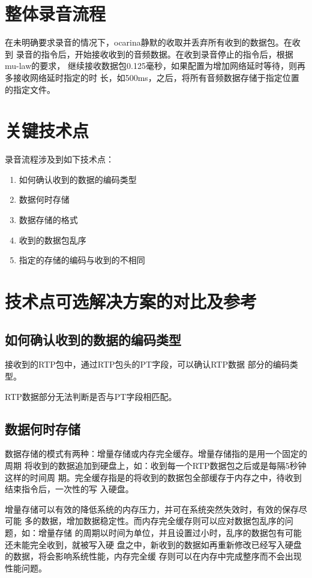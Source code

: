 \documentclass[11pt]{article}
\begin{document}
\section{整体录音流程}
    在未明确要求录音的情况下，ocarina静默的收取并丢弃所有收到的数据包。在收到
录音的指令后，开始接收收到的音频数据。在收到录音停止的指令后，根据mu-law的要求，
继续接收数据包0.125毫秒，如果配置为增加网络延时等待，则再多接收网络延时指定的时
长，如500ms，之后，将所有音频数据存储于指定位置的指定文件。
\section{关键技术点}
录音流程涉及到如下技术点：
    \begin{enumerate}
        \item 如何确认收到的数据的编码类型
        \item 数据何时存储
        \item 数据存储的格式
        \item 收到的数据包乱序
        \item 指定的存储的编码与收到的不相同
    \end{enumerate}
\section{技术点可选解决方案的对比及参考}
\subsection{如何确认收到的数据的编码类型}
    接收到的RTP包中，通过RTP包头的PT字段，可以确认RTP数据
部分的编码类型。

    RTP数据部分无法判断是否与PT字段相匹配。
\subsection{数据何时存储}
    数据存储的模式有两种：增量存储或内存完全缓存。增量存储指的是用一个固定的周期
将收到的数据追加到硬盘上，如：收到每一个RTP数据包之后或是每隔5秒钟这样的时间周
期。完全缓存指是的将收到的数据包全部缓存于内存之中，待收到结束指令后，一次性的写
入硬盘。

    增量存储可以有效的降低系统的内存压力，并可在系统突然失效时，有效的保存尽可能
多的数据，增加数据稳定性。而内存完全缓存则可以应对数据包乱序的问题，如：增量存储
的周期以时间为单位，并且设置过小时，乱序的数据包有可能还未能完全收到，就被写入硬
盘之中，新收到的数据如再重新修改已经写入硬盘的数据，将会影响系统性能，内存完全缓
存则可以在内存中完成整序而不会出现性能问题。
\end{document}
